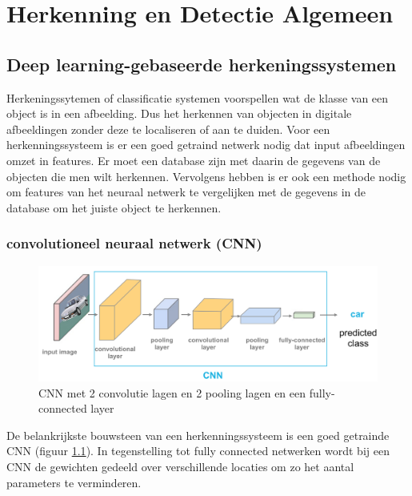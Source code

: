 \chapter{Herkenning en Detectie Algemeen}

\section{Deep learning-gebaseerde herkeningssystemen}
Herkeningssytemen of classificatie systemen voorspellen wat de klasse van een object is in een afbeelding. Dus het herkennen van objecten in digitale afbeeldingen zonder deze te localiseren of aan te duiden. Voor een herkenningssysteem is er een goed getraind netwerk nodig dat input afbeeldingen omzet in features. Er moet een database zijn met daarin de gegevens van de objecten die men wilt herkennen. Vervolgens hebben is er ook een methode nodig om features van het neuraal netwerk te vergelijken met de gegevens in de database om het juiste object te herkennen.

\subsection{convolutioneel neuraal netwerk (CNN) }
\begin{figure}[!ht]
    \centering
 	\includegraphics[width=0.80\linewidth]{fig/CNN.png}
 	\caption{CNN met 2 convolutie lagen en 2 pooling lagen en een fully-connected layer}
 	\label{fig:cnn}
\end{figure}

De belankrijkste bouwsteen van een herkenningssysteem is een goed getrainde CNN (figuur \ref{fig:cnn}). In tegenstelling tot fully connected netwerken wordt bij een CNN de gewichten gedeeld over verschillende locaties om zo het aantal parameters te verminderen.

